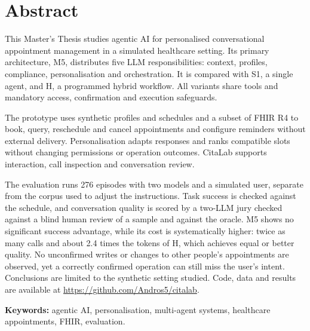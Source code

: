 \chapter*{Abstract}

This Master's Thesis studies agentic AI for personalised conversational
appointment management in a simulated healthcare setting. Its primary
architecture, M5, distributes five LLM responsibilities: context, profiles,
compliance, personalisation and orchestration. It is compared with S1, a
single agent, and H, a programmed hybrid workflow. All variants share tools
and mandatory access, confirmation and execution safeguards.

The prototype uses synthetic profiles and schedules and a subset of FHIR R4
to book, query, reschedule and cancel appointments and configure reminders
without external delivery. Personalisation adapts responses and ranks
compatible slots without changing permissions or operation outcomes.
CitaLab supports interaction, call inspection and conversation review.

The evaluation runs 276 episodes with two models and a simulated user,
separate from the corpus used to adjust the instructions. Task success is
checked against the schedule, and conversation quality is scored by a two-LLM
jury checked against a blind human review of a sample and against the oracle. M5
shows no significant success advantage, while its cost is systematically
higher: twice as many calls and about 2.4 times the tokens of H, which achieves
equal or better quality. No unconfirmed writes or changes to other people's
appointments are observed, yet a correctly confirmed operation can still miss
the user's intent. Conclusions are limited
to the synthetic setting studied. Code, data and
results are available at \url{https://github.com/Andros5/citalab}.

\vspace{1em}
\noindent\textbf{Keywords:} agentic AI, personalisation, multi-agent systems,
healthcare appointments, FHIR, evaluation.
